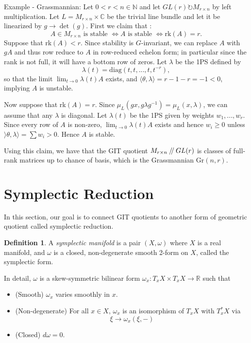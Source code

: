 \documentclass{article}
\theoremstyle{definition}
\newtheorem{definition}[theorem]{Definition}
\theoremstyle{remark}
\numberwithin{theorem}{section}
\newcommand{\C}{\mathbb{C}}
\newcommand{\sslash}{\mathbin{/\mkern-4mu/}}
\newenvironment{defn}{
	\begin{mdframed}
		\vspace{-0.5em}
		\begin{definition}
		}{
		\end{definition}
	\end{mdframed}
}
\begin{document}
	Example - Grassmannian: Let $0<r<n \in\mathbb{N}$ and let $GL(r)\circlearrowright M_{r\times n}$ by left multiplication. Let $L=M_{r\times n}\times \C$ be the trivial line bundle and let it be linearized by $g\to \det(g)$. First we claim that :
 $$A\in M_{r\times n} \text{ is stable } \iff A \text{ is stable } \iff \text{rk}(A)=r.$$
	Suppose that rk$(A)<r$. Since stability is $G$-invariant, we can replace $A$ with $gA$ and thus row reduce to $A$ in row-reduced echelon form; in particular since the rank is not full, it will have a bottom row of zeros. Let $\lambda$ be the 1PS defined by
	$$ \lambda(t) = \text{diag}(t,t,...,t,t^{-r}), $$
	so that the limit $\lim_{t\to 0}\lambda(t) A$ exists, and $\langle \theta, \lambda \rangle = r-1-r = -1 < 0$, implying $A$ is unstable. \vspace{1em}
	
	Now suppose that rk$(A)=r$.  Since $\mu_L(gx, g\lambda g^{-1}) = \mu_L(x,\lambda)$, we can assume that any $\lambda$ is diagonal. Let $\lambda(t)$ be the 1PS given by weights $w_1,...,w_r$. Since every row of $A$ is non-zero, $\lim_{t\to 0}\lambda(t)A$ exists and hence $w_i\geq 0$ unless $\rangle \theta, \lambda \rangle = \sum w_i > 0$. Hence $A$ is stable. \vspace{1em}
	
	Using this claim, we have that the GIT quotient $M_{r\times n}\sslash GL(r)$ is classes of full-rank matrices up to chance of basis, which is the Grassmannian Gr$(n,r)$. 
	
	\pagebreak
	
	\section{Symplectic Reduction}
	In this section, our goal is to connect GIT quotients to another form of geometric quotient called symplectic reduction. 
	
	\begin{defn}
		A \emph{symplectic manifold} is a pair $(X,\omega)$ where $X$ is a real manifold, and $\omega$ is a closed, non-degenerate smooth 2-form on $X$, called the symplectic form. \vspace{1em}
		
		In detail, $\omega$ is a skew-symmetric bilinear form $\omega_x:T_xX\times T_xX \to \mathbb{R}$ such that
		\begin{itemize}
			\item (Smooth) $\omega_x$ varies smoothly in $x$.
			\item (Non-degenerate) For all $x\in X$, $\omega_x$ is an isomorphism of $T_xX$ with $T_x^\ast X$ via
			$$\xi \to \omega_x(\xi, -)$$
			\item (Closed) $d\omega =0$.
		\end{itemize}
		\end{defn}
		
\end{document}
